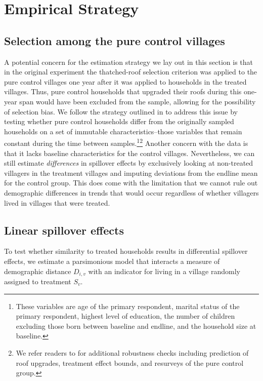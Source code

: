 \documentclass[11pt]{article}
\begin{document}
\section{Empirical Strategy}

    \subsection{Selection among the pure control villages}

        A potential concern for the estimation strategy we lay out in this section is that in the original experiment the thatched-roof selection criterion was applied to the pure control villages one year after it was applied to households in the treated villages. Thus, pure control households that upgraded their roofs during this one-year span would have been excluded from the sample, allowing for the possibility of selection bias. We follow the strategy outlined in \textcite{haushofer_short-term_2016} to address this issue by testing whether pure control households differ from the originally sampled households on a set of immutable characteristics--those variables that remain constant during the time between samples.\footnote{These variables are age of the primary respondent, marital status of the primary respondent, highest level of education, the number of children excluding those born between baseline and endline, and the household size at baseline.}\footnote{We refer readers to \textcite{haushofer_short-term_2016} for additional robustness checks including prediction of roof upgrades, treatment effect bounds, and resurveys of the pure control group.} Another concern with the data is that it lacks baseline characteristics for the control villages. Nevertheless, we can still estimate \textit{differences} in spillover effects by exclusively looking at non-treated villagers in the treatment villages and imputing deviations from the endline mean for the control group. This does come with the limitation that we cannot rule out demographic differences in trends that would occur regardless of whether villagers lived in villages that were treated.

    \subsection{Linear spillover effects}

        To test whether similarity to treated households results in differential spillover effects, we estimate a parsimonious model that interacts a measure of demographic distance $D_{i,v}$ with an indicator for living in a village randomly assigned to treatment $S_v$.
\end{document}
